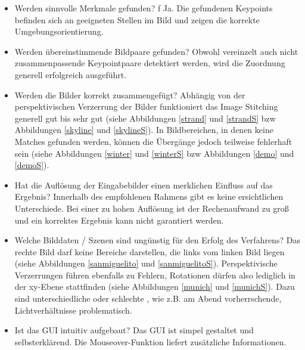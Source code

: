 \documentclass[deutsch]{scrartcl}
\begin{document}
\begin{itemize}
	\item Werden sinnvolle Merkmale gefunden? f
		Ja. Die gefundenen Keypoints befinden sich an geeigneten Stellen im Bild und zeigen die korrekte Umgebungsorientierung.
	\item Werden übereinstimmende Bildpaare gefunden? 
		Obwohl vereinzelt auch nicht zusammenpassende Keypointpaare detektiert werden, wird die Zuordnung generell erfolgreich ausgeführt.
	\item Werden die Bilder korrekt zusammengefügt? 
		Abhängig von der perspektivischen Verzerrung der Bilder funktioniert das Image Stitching generell gut bis sehr gut (siehe Abbildungen \ref{strand} und \ref{strandS} bzw Abbildungen \ref{skyline} und \ref{skylineS}). In Bildbereichen, in denen keine Matches gefunden werden, können die Übergänge jedoch teilweise fehlerhaft sein (siehe Abbildungen \ref{winter} und \ref{winterS} bzw Abbildungen \ref{demo} und \ref{demoS}).
	\item Hat die Auflösung der Eingabebilder einen merklichen Einﬂuss auf das Ergebnis? 
		Innerhalb des empfohlenen Rahmens gibt es keine ersichtlichen Unterschiede. Bei einer zu hohen Auflösung ist der Rechenaufwand zu groß und ein korrektes Ergebnis kann nicht garantiert werden. 
	\item Welche Bilddaten / Szenen sind ungünstig für den Erfolg des Verfahrens? 
		Das rechte Bild darf keine Bereiche darstellen, die links vom linken Bild liegen (siehe Abbildungen \ref{sanmiguelito} und \ref{sanmiguelitoS}). Perspektivische Verzerrungen führen ebenfalls zu Fehlern, Rotationen dürfen also lediglich in der xy-Ebene stattfinden (siehe Abbildungen \ref{munich} und \ref{munichS}). Dazu sind unterschiedliche oder schlechte , wie z.B. am Abend vorherrschende, Lichtverhältnisse problematisch.
	\item Ist das GUI intuitiv aufgebaut?
		Das GUI ist simpel gestaltet und selbsterklärend. Die Mouseover-Funktion liefert zusätzliche Informationen.
\end{itemize}

\newpage
\end{document}
